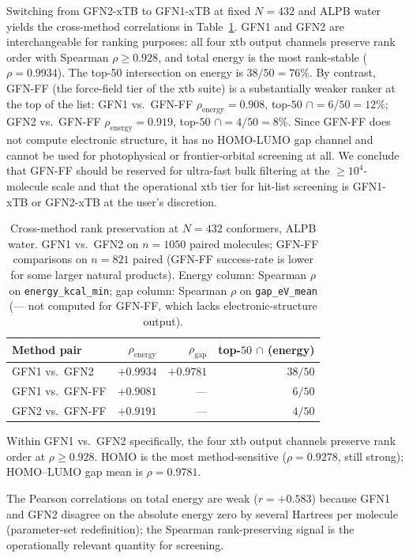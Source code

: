 \documentclass[11pt,a4paper]{article}
\begin{document}
Switching from GFN2-xTB to GFN1-xTB at fixed $N = 432$ and ALPB water
yields the cross-method correlations in Table~\ref{tab:cross-method}.
GFN1 and GFN2 are interchangeable for ranking purposes: all four xtb
output channels preserve rank order with Spearman $\rho \geq 0.928$,
and total energy is the most rank-stable ($\rho = 0.9934$). The
top-50 intersection on energy is $38/50 = 76\%$. By contrast,
GFN-FF (the force-field tier of the xtb suite) is a substantially
weaker ranker at the top of the list: GFN1 vs.\ GFN-FF
$\rho_{\text{energy}} = 0.908$, top-$50$ $\cap = 6/50 = 12\%$;
GFN2 vs.\ GFN-FF $\rho_{\text{energy}} = 0.919$,
top-$50$ $\cap = 4/50 = 8\%$. Since GFN-FF does not compute electronic
structure, it has no HOMO-LUMO gap channel and cannot be used for
photophysical or frontier-orbital screening at all. We conclude that
GFN-FF should be reserved for ultra-fast bulk filtering at the
$\geq 10^4$-molecule scale and that the operational xtb tier for
hit-list screening is GFN1-xTB or GFN2-xTB at the user's discretion.

\begin{table}[ht]
\centering
\caption{Cross-method rank preservation at $N = 432$ conformers,
ALPB water. GFN1 vs.\ GFN2 on $n = 1050$ paired molecules; GFN-FF
comparisons on $n = 821$ paired (GFN-FF success-rate is lower for
some larger natural products). Energy column: Spearman $\rho$ on
\texttt{energy\_kcal\_min}; gap column: Spearman $\rho$ on
\texttt{gap\_eV\_mean} (--- not computed for GFN-FF, which lacks
electronic-structure output).}
\label{tab:cross-method}
\small
\begin{tabular}{lrrr}
\toprule
Method pair         & $\rho_{\text{energy}}$ & $\rho_{\text{gap}}$ & top-$50$ $\cap$ (energy) \\
\midrule
GFN1 vs.\ GFN2      & $+0.9934$ & $+0.9781$ & $38/50$ \\
GFN1 vs.\ GFN-FF    & $+0.9081$ & ---       & $6/50$  \\
GFN2 vs.\ GFN-FF    & $+0.9191$ & ---       & $4/50$  \\
\bottomrule
\end{tabular}
\end{table}

Within GFN1 vs.\ GFN2 specifically, the four xtb output channels
preserve rank order at $\rho \geq 0.928$. HOMO is the most
method-sensitive ($\rho = 0.9278$, still strong); HOMO--LUMO gap
mean is $\rho = 0.9781$.

The Pearson correlations on total energy are weak ($r = +0.583$)
because GFN1 and GFN2 disagree on the absolute energy zero by
several Hartrees per molecule (parameter-set redefinition); the
Spearman rank-preserving signal is the operationally relevant
quantity for screening.
\end{document}
